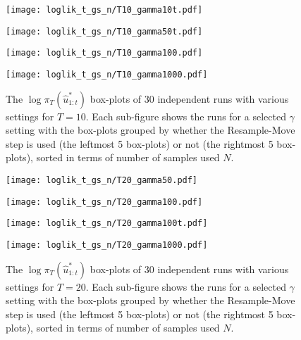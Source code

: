 \begin{figure}[!thbp]
    \centering
    \begin{minipage}{0.5\textwidth}
        \centering
        \texttt{[image: loglik\_t\_gs\_n/T10\_gamma10t.pdf]}
    \end{minipage}%
    \begin{minipage}{0.5\textwidth}
        \centering
        \texttt{[image: loglik\_t\_gs\_n/T10\_gamma50t.pdf]}
    \end{minipage}
    \begin{minipage}{0.5\textwidth}
        \centering
        \texttt{[image: loglik\_t\_gs\_n/T10\_gamma100.pdf]}
    \end{minipage}%
    \begin{minipage}{0.5\textwidth}
        \centering
        \texttt{[image: loglik\_t\_gs\_n/T10\_gamma1000.pdf]}
    \end{minipage}
    \caption{The $\log\pi_T(\hat{u}^*_{1:t})$ box-plots of 30 independent runs with various settings for $T=10$. Each sub-figure shows the runs for a selected $\gamma$ setting with the box-plots grouped by whether the Resample-Move step is used (the leftmost 5 box-plots) or not (the rightmost 5 box-plots), sorted in terms of number of samples used $N$.}
    \label{fig:rm2}
\end{figure}

\begin{figure}[!thbp]
    \centering
    \begin{minipage}{0.5\textwidth}
        \centering
        \texttt{[image: loglik\_t\_gs\_n/T20\_gamma50.pdf]}
    \end{minipage}%
    \begin{minipage}{0.5\textwidth}
        \centering
        \texttt{[image: loglik\_t\_gs\_n/T20\_gamma100.pdf]}
    \end{minipage}
    \begin{minipage}{0.5\textwidth}
        \centering
        \texttt{[image: loglik\_t\_gs\_n/T20\_gamma100t.pdf]}
    \end{minipage}%
    \begin{minipage}{0.5\textwidth}
        \centering
        \texttt{[image: loglik\_t\_gs\_n/T20\_gamma1000.pdf]}
    \end{minipage}
    \caption{The $\log\pi_T(\hat{u}^*_{1:t})$ box-plots of 30 independent runs with various settings for $T=20$. Each sub-figure shows the runs for a selected $\gamma$ setting with the box-plots grouped by whether the Resample-Move step is used (the leftmost 5 box-plots) or not (the rightmost 5 box-plots), sorted in terms of number of samples used $N$.}
    \label{fig:rm3}
\end{figure}


